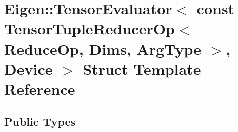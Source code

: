 \hypertarget{struct_eigen_1_1_tensor_evaluator_3_01const_01_tensor_tuple_reducer_op_3_01_reduce_op_00_01_dimsa9704c68eb01932857866cfd0005279c}{}\section{Eigen\+:\+:Tensor\+Evaluator$<$ const Tensor\+Tuple\+Reducer\+Op$<$ Reduce\+Op, Dims, Arg\+Type $>$, Device $>$ Struct Template Reference}
\label{struct_eigen_1_1_tensor_evaluator_3_01const_01_tensor_tuple_reducer_op_3_01_reduce_op_00_01_dimsa9704c68eb01932857866cfd0005279c}
\subsection*{Public Types}
